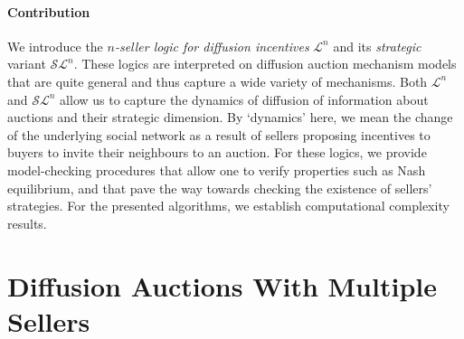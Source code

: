 \documentclass[letterpaper]{article} %
\theoremstyle{definition}
\newcommand{\munyque}[1]{{[\color{red}#1]}}
\newcommand{\laurent}[1]{{[\color{purple}#1]}}
\begin{document}
\paragraph{Contribution} %
We introduce the \textit{$n$-seller logic for diffusion incentives} $
\mathcal{L}^n$ and its \textit{strategic} variant $\mathcal{SL}^n$. These logics are interpreted on diffusion auction mechanism models that are quite general and thus capture a wide variety of mechanisms. Both $\mathcal{L}^n$ and $\mathcal{SL}^n$ allow us to capture the dynamics of diffusion of information about auctions and their strategic dimension. By `dynamics' here, we mean the change of the underlying social network as a result of sellers proposing incentives to buyers to invite their neighbours to an auction. For these logics, we provide model-checking procedures that allow one to verify properties such as Nash equilibrium, and that pave the way towards checking the existence of sellers' strategies. For the presented algorithms, we establish computational complexity results.


\section{Diffusion Auctions With Multiple Sellers}
\end{document}
